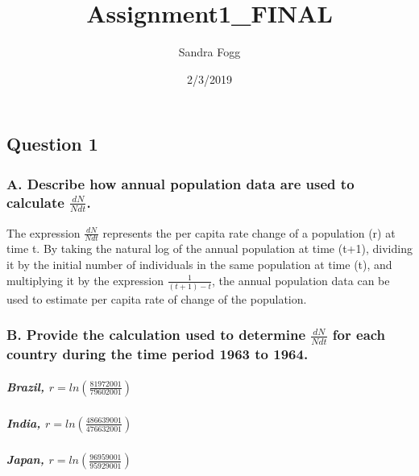 \documentclass[]{article}
\title{Assignment1\_FINAL}
\author{Sandra Fogg}
\date{2/3/2019}
\let\oldsubparagraph\subparagraph
\renewcommand{\subparagraph}[1]{\oldsubparagraph{#1}\mbox{}}
\begin{document}
\maketitle

\subsection{Question 1}\label{question-1}

\subsubsection{\texorpdfstring{A. Describe how annual population data
are used to calculate
\(\frac{dN}{Ndt}\).}{A. Describe how annual population data are used to calculate \textbackslash{}frac\{dN\}\{Ndt\}.}}\label{a.-describe-how-annual-population-data-are-used-to-calculate-fracdnndt.}

The expression \(\frac{dN}{Ndt}\) represents the per capita rate change
of a population (r) at time t. By taking the natural log of the annual
population at time (t+1), dividing it by the initial number of
individuals in the same population at time (t), and multiplying it by
the expression \(\frac{1}{(t+1)-t}\), the annual population data can be
used to estimate per capita rate of change of the population.

\subsubsection{\texorpdfstring{B. Provide the calculation used to
determine \(\frac{dN}{Ndt}\) for each country during the time period
1963 to
1964.}{B. Provide the calculation used to determine \textbackslash{}frac\{dN\}\{Ndt\} for each country during the time period 1963 to 1964.}}\label{b.-provide-the-calculation-used-to-determine-fracdnndt-for-each-country-during-the-time-period-1963-to-1964.}

\subparagraph{\texorpdfstring{Brazil,
\(r= ln\left(\frac{81972001}{79602001}\right)\)}{Brazil, r= ln\textbackslash{}left(\textbackslash{}frac\{81972001\}\{79602001\}\textbackslash{}right)}}\label{brazil-r-lnleftfrac8197200179602001right}

\subparagraph{\texorpdfstring{India,
\(r= ln\left(\frac{486639001}{476632001}\right)\)}{India, r= ln\textbackslash{}left(\textbackslash{}frac\{486639001\}\{476632001\}\textbackslash{}right)}}\label{india-r-lnleftfrac486639001476632001right}

\subparagraph{\texorpdfstring{Japan,
\(r= ln\left(\frac{96959001}{95929001}\right)\)}{Japan, r= ln\textbackslash{}left(\textbackslash{}frac\{96959001\}\{95929001\}\textbackslash{}right)}}\label{japan-r-lnleftfrac9695900195929001right}
\end{document}
